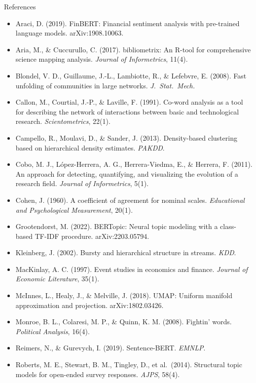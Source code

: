 \documentclass[aspectratio=169,10pt]{beamer}
\begin{document}
\begin{frame}{References}
\fontsize{6.2}{7.2}\selectfont
\begin{itemize}\setlength\itemsep{0pt}
\item Araci, D. (2019). FinBERT: Financial sentiment analysis with pre-trained language models. arXiv:1908.10063.
\item Aria, M., \& Cuccurullo, C. (2017). bibliometrix: An R-tool for comprehensive science mapping analysis. \emph{Journal of Informetrics}, 11(4).
\item Blondel, V. D., Guillaume, J.-L., Lambiotte, R., \& Lefebvre, E. (2008). Fast unfolding of communities in large networks. \emph{J.\ Stat.\ Mech.}
\item Callon, M., Courtial, J.-P., \& Laville, F. (1991). Co-word analysis as a tool for describing the network of interactions between basic and technological research. \emph{Scientometrics}, 22(1).
\item Campello, R., Moulavi, D., \& Sander, J. (2013). Density-based clustering based on hierarchical density estimates. \emph{PAKDD}.
\item Cobo, M. J., López-Herrera, A. G., Herrera-Viedma, E., \& Herrera, F. (2011). An approach for detecting, quantifying, and visualizing the evolution of a research field. \emph{Journal of Informetrics}, 5(1).
\item Cohen, J. (1960). A coefficient of agreement for nominal scales. \emph{Educational and Psychological Measurement}, 20(1).
\item Grootendorst, M. (2022). BERTopic: Neural topic modeling with a class-based TF-IDF procedure. arXiv:2203.05794.
\item Kleinberg, J. (2002). Bursty and hierarchical structure in streams. \emph{KDD}.
\item MacKinlay, A. C. (1997). Event studies in economics and finance. \emph{Journal of Economic Literature}, 35(1).
\item McInnes, L., Healy, J., \& Melville, J. (2018). UMAP: Uniform manifold approximation and projection. arXiv:1802.03426.
\item Monroe, B. L., Colaresi, M. P., \& Quinn, K. M. (2008). Fightin' words. \emph{Political Analysis}, 16(4).
\item Reimers, N., \& Gurevych, I. (2019). Sentence-BERT. \emph{EMNLP}.
\item Roberts, M. E., Stewart, B. M., Tingley, D., et al.\ (2014). Structural topic models for open-ended survey responses. \emph{AJPS}, 58(4).

\end{itemize}
\end{frame}
\end{document}
